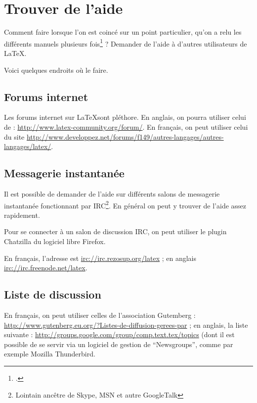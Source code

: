 \chapter{Trouver de l'aide}

\begin{intro}
Comment faire lorsque l'on est coincé sur un point particulier, qu'on a relu les différents manuels plusieurs fois\footcite[Signalons au passage la possibilité de télécharger une aide sur l'ensemble des erreurs de compilation avec \LaTeX :][]{erreurscompilo} ? Demander de l'aide à d'autres utilisateurs de \LaTeX{}.

Voici quelques endroits où le faire. 
\end{intro}


\section{Forums internet}

Les forums internet sur \LaTeX sont pléthore. En anglais, on pourra utiliser celui de  : \url{http://www.latex-community.org/forum/}. En français, on peut utiliser celui du site  \url{http://www.developpez.net/forums/f149/autres-langages/autres-langages/latex/}.


\section{Messagerie instantanée}

Il est possible de demander de l'aide sur différents salons de messagerie instantanée fonctionnant par IRC\footnote{Lointain ancêtre de Skype, MSN et autre GoogleTalk}. En général on peut y trouver de l'aide assez rapidement.

Pour se connecter à un salon de discussion IRC, on peut utiliser le plugin Chatzilla du logiciel libre Firefox.

En français, l'adresse est \url{irc://irc.rezosup.org/latex} ; en anglais
\url{irc://irc.freenode.net/latex}.


\section{Liste de discussion}

En français, on peut utiliser celles de l'association Gutemberg : \url{http://www.gutenberg.eu.org/?Listes-de-diffusion-gerees-par} ; en anglais,  la liste suivante : \url{http://groups.google.com/group/comp.text.tex/topics} (dont il est possible de se servir via un logiciel de gestion de \enquote{{Newsgroups}}, comme par exemple Mozilla Thunderbird.
